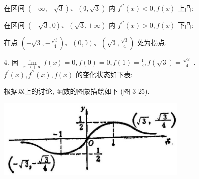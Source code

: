 \documentclass[10pt]{article}
\begin{document}
在区间 \(\left( {-\infty , - \sqrt{3}}\right) \text{、}\left( {0,\sqrt{3}}\right)\) 内 \({f}^{\prime \prime }\left( x\right) < 0,f\left( x\right)\) 上凸;

在区间 \(\left( {-\sqrt{3},0}\right) \text{、}\left( {\sqrt{3}, + \infty }\right)\) 内 \({f}^{\prime \prime }\left( x\right) > 0,f\left( x\right)\) 下凸;

在点 \(\left( {-\sqrt{3}, - \frac{\sqrt{3}}{4}}\right) \text{、}\left( {0,0}\right) \text{、}\left( {\sqrt{3},\frac{\sqrt{3}}{4}}\right)\) 处为拐点.

4. 因 \(\mathop{\lim }\limits_{{x \rightarrow + \infty }}f\left( x\right) = 0,f\left( 0\right) = 0,f\left( 1\right) = \frac{1}{2},f\left( \sqrt{3}\right) = \frac{\sqrt{3}}{4}\) . \({f}^{\prime }\left( x\right) ,{f}^{\prime \prime }\left( x\right) ,f\left( x\right)\) 的变化状态如下表:

\begin{center}
\end{center}

根据以上的讨论, 函数的图象描绘如下 (图 3-25).

\begin{center}
\includegraphics[max width=0.7\textwidth]{images/01912c18-5c3f-733d-b775-749ba9897a9d_172_655401.jpg}
\end{center}
\end{document}
